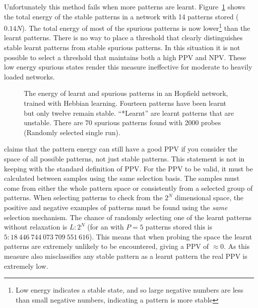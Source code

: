 Unfortunately this method fails when more patterns are learnt.  Figure~\ref{fig:PEmeasureOverload} shows the total energy of the stable patterns in a network with 14 patterns stored ($0.14N$). The total energy of most of the spurious patterns is now lower\footnote{Low energy indicates a stable state, and so large negative numbers are less than small negative numbers, indicating a pattern is more stable} than the learnt patterns.  There is no way to place a threshold that clearly distinguishes stable learnt patterns from stable spurious patterns.  In this situation it is not possible to select a threshold that maintains both a high PPV and NPV.  These low energy spurious states render this measure ineffective for moderate to heavily loaded networks.  

\begin{figure}[tbp]
	\center
	\small
%		
	\caption{The energy of learnt and spurious patterns in an  Hopfield network, trained with Hebbian learning.  Fourteen patterns have been learnt but only twelve remain stable.  ``*Learnt'' are learnt patterns that are unstable. There are 70 spurious patterns found with 2000 probes (Randomly selected single run).}
	\label{fig:PEmeasureOverload}
\end{figure}


\citet{Bogacz2001} claims that the pattern energy can still have a good PPV if you consider the space of all possible patterns, not just stable patterns.  This statement is not in keeping with the standard definition of PPV. For the PPV to be valid, it must be calculated between samples using the same selection basis.  The samples must come from either the whole pattern space or consistently from a selected group of patterns. When selecting patterns to check from the \(2^N\) dimensional space, the positive and negative examples of patterns must be found using the \emph{same} selection mechanism.  The chance of randomly selecting one of the learnt patterns without relaxation is $L:2^{N}$ (for an  with $P=5$ patterns stored this is  \(5: 18\ 446\ 744\ 073\ 709\ 551\ 616\)).  This means that when probing the space the learnt patterns are extremely unlikely to be encountered, giving a PPV of $\approx0$.  As this measure also misclassifies any stable pattern as a learnt pattern the real PPV is extremely low.

